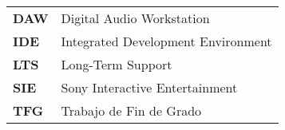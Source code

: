 
\renewcommand{\arraystretch}{1.5}



\begin{longtable}{l p{13.7cm}}
	
\textbf{DAW} & Digital Audio Workstation \\
\textbf{IDE} & Integrated Development Environment \\
\textbf{LTS} & Long-Term Support \\
\textbf{SIE} & Sony Interactive Entertainment \\
\textbf{TFG} & Trabajo de Fin de Grado \\

\end{longtable}
